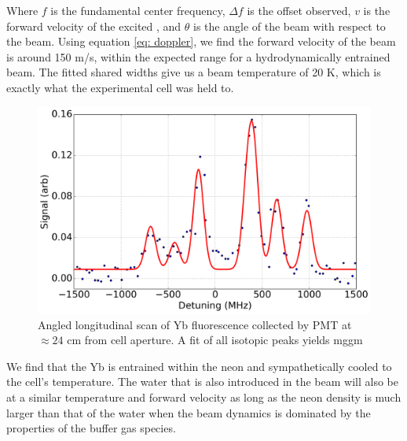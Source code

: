 Where $f$ is the fundamental center frequency, $\Delta f$ is the offset observed, $v$ is the forward velocity of the excited , and $\theta$ is the angle of the beam with respect to the beam. Using equation \ref{eq: doppler}, we find the forward velocity of the beam is around 150 m/s, within the expected range for a hydrodynamically entrained beam. The fitted shared widths give us a beam temperature of 20 K, which is exactly what the experimental cell was held to.

\begin{figure}[H]
\end{figure}


\begin{figure}[H]
	\centering
	\includegraphics[width=1\textwidth]{images/CBGB_Yb_spectrum_long.png}
	\caption{Angled longitudinal scan of Yb fluorescence collected by PMT at $\approx 24$ cm from cell aperture. A fit of all isotopic peaks yields mggm}
	\label{fig: yb spectrum}
\end{figure}

We find that the Yb is entrained within the neon and sympathetically cooled to the cell's temperature. The water that is also introduced in the beam will also be at a similar temperature and forward velocity as long as the neon density is much larger than that of the water when the beam dynamics is dominated by the properties of the buffer gas species.
